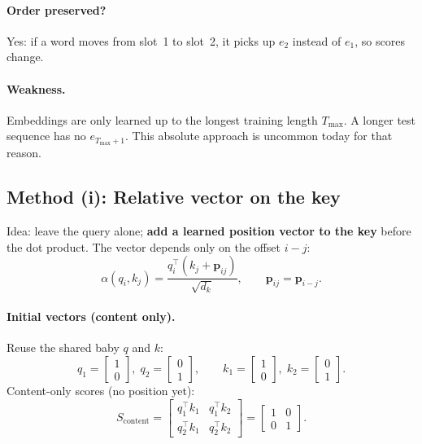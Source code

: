\documentclass[11pt]{article}
\begin{document}
\paragraph{Order preserved?}
Yes: if a word moves from slot~1 to slot~2, it picks up \(e_2\) instead of
\(e_1\), so scores change.

\paragraph{Weakness.}
Embeddings are only learned up to the longest training length \(T_{\max}\).
A longer test sequence has no \(e_{T_{\max}+1}\). This absolute approach is
uncommon today for that reason.

\subsection{Method (i): Relative vector on the key}

Idea: leave the query alone; \textbf{add a learned position vector to the
key} before the dot product. The vector depends only on the offset
\(i-j\):
\[
  \alpha(q_i,k_j)
  =
  \frac{q_i^\top (k_j + \mathbf{p}_{ij})}{\sqrt{d_k}},
  \qquad
  \mathbf{p}_{ij} = \mathbf{p}_{i-j}.
\]

\paragraph{Initial vectors (content only).}
Reuse the shared baby \(q\) and \(k\):
\[
  q_1=\begin{bmatrix}1\\0\end{bmatrix},\;
  q_2=\begin{bmatrix}0\\1\end{bmatrix},\qquad
  k_1=\begin{bmatrix}1\\0\end{bmatrix},\;
  k_2=\begin{bmatrix}0\\1\end{bmatrix}.
\]
Content-only scores (no position yet):
\[
  S_{\text{content}}
  =
  \begin{bmatrix}
    q_1^\top k_1 & q_1^\top k_2 \\
    q_2^\top k_1 & q_2^\top k_2
  \end{bmatrix}
  =
  \begin{bmatrix}1&0\\0&1\end{bmatrix}.
\]
\end{document}
